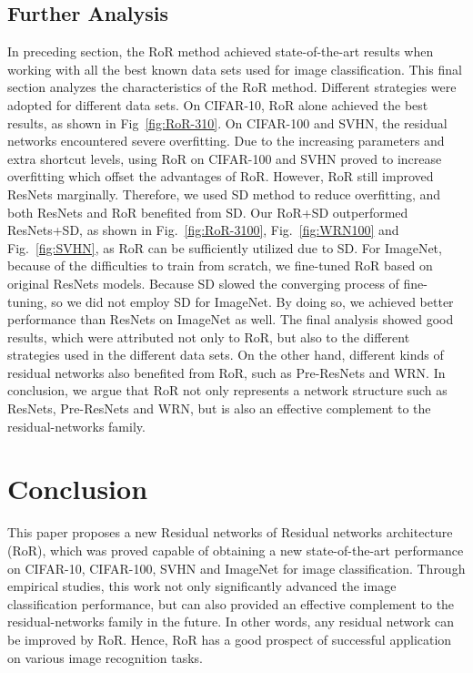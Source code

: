 \documentclass[journal]{IEEEtran}
\begin{document}
\subsection{Further Analysis}
In preceding section, the RoR method achieved state-of-the-art results when working with all the best known data sets used for image classification. This final section analyzes the characteristics of the RoR method. Different strategies were adopted for different data sets. On CIFAR-10, RoR alone achieved the best results, as shown in Fig~\ref{fig:RoR-310}. On CIFAR-100 and SVHN, the residual networks encountered severe overfitting. Due to the increasing parameters and extra shortcut levels, using RoR on CIFAR-100 and SVHN proved to increase overfitting which offset the advantages of RoR. However, RoR still improved ResNets marginally. Therefore, we used SD method to reduce overfitting, and both ResNets and RoR benefited from SD. Our RoR+SD outperformed ResNets+SD, as shown in Fig.~\ref{fig:RoR-3100}, Fig.~\ref{fig:WRN100} and Fig.~\ref{fig:SVHN}, as RoR can be sufficiently utilized due to SD. For ImageNet, because of the difficulties to train from scratch, we fine-tuned RoR based on original ResNets models. Because SD slowed the converging process of fine-tuning, so we did not employ SD for ImageNet. By doing so, we achieved better performance than ResNets on ImageNet as well. The final analysis showed good results, which were attributed not only to RoR, but also to the different strategies used in the different data sets. On the other hand, different kinds of residual networks also benefited from RoR, such as Pre-ResNets and WRN. In conclusion, we argue that RoR not only represents a network structure such as ResNets, Pre-ResNets and WRN, but is also an effective complement to the residual-networks family. 

















\section{Conclusion}
This paper proposes a new Residual networks of Residual networks architecture (RoR), which was proved capable of obtaining a new state-of-the-art performance on CIFAR-10, CIFAR-100, SVHN and ImageNet for image classification. Through empirical studies, this work not only significantly advanced the image classification performance, but can also provided an effective complement to the residual-networks family in the future. In other words, any residual network can be improved by RoR. Hence, RoR has a good prospect of successful application on various image recognition tasks.
\end{document}
